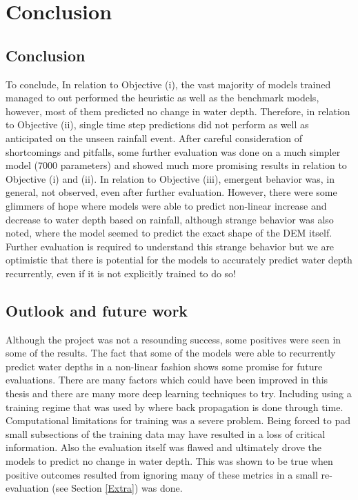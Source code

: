 
\chapter{Conclusion} %
\label{Chapter6} %

\section{Conclusion}
To conclude, In relation to Objective (i), the vast majority of models trained managed to out performed the heuristic as well as the benchmark models, however, most of them predicted no change in water depth. Therefore, in relation to Objective (ii), single time step predictions did not perform as well as anticipated on the unseen rainfall event. After careful consideration of shortcomings and pitfalls, some further evaluation was done on a much simpler model (7000 parameters) and showed much more promising results in relation to Objective (i) and (ii). In relation to Objective (iii), emergent behavior was, in general, not observed, even after further evaluation. However, there were some glimmers of hope where models were able to predict non-linear increase and decrease to water depth based on rainfall, although strange behavior was also noted, where the model seemed to predict the exact shape of the DEM itself. Further evaluation is required to understand this strange behavior but we are optimistic that there is potential for the models to accurately predict water depth recurrently, even if it is not explicitly trained to do so!

\section{Outlook and future work}
Although the project was not a resounding success, some positives were seen in some of the results. The fact that some of the models were able to recurrently predict water depths in a non-linear fashion shows some promise for future evaluations. There are many factors which could have been improved in this thesis and there are many more deep learning techniques to try. Including using a training regime that was used by \citeauthor{growing_nca} where back propagation is done through time. Computational limitations for training was a severe problem. Being forced  to pad small subsections of the training data may have resulted in a loss of critical information. Also the evaluation itself  was flawed and ultimately drove the models to predict no change in water depth. This was shown to be true when positive outcomes resulted from ignoring many of these metrics in a small re-evaluation (see Section \ref{Extra}) was done.


